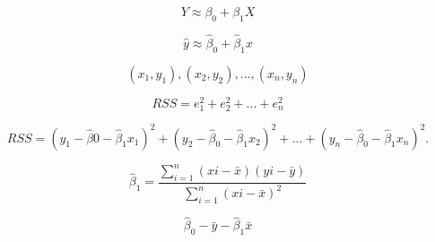 \documentclass{article}
\begin{document}
$$  
Y \approx \beta_0 + \beta_1 X
$$

$$
\hat y \approx \hat\beta_0 + \hat\beta_1 x
$$

$$ 
(x_1,y_1), (x_2,y_2),..., (x_n,y_n)
$$
  
  
$$
RSS = e^2 _1 + e^2 _2 +...+ e^2 _n
$$
 
$$
RSS = (y_1-\hat\beta0-\hat\beta_1x_1)^2+(y_2-\hat\beta_0-\hat\beta_1x_2)^2+...+(y_n-\hat\beta_0-\hat\beta_1x_n)^2.
$$

$$
\hat \beta_1  = 
\frac{ 
\sum_{i=1}^{n}	(	xi -\bar{x} )	(yi - \bar{y}	)	} 
{\sum_{i=1}^{n}	(	xi -\bar{x} )^2
}
$$

$$
\hat\beta_0 - \bar{y} - \hat\beta_1 \bar{x}
$$
\end{document}
